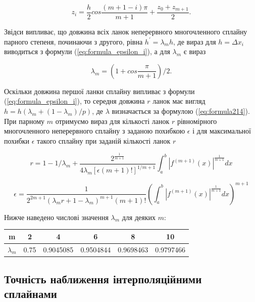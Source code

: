 \documentclass[ukrainian,14pt]{extarticle}
\begin{document}
$$z_i = \frac{h}{2} cos \frac{(m+1-i)\pi}{m+1} + \frac{z_0 + z_{m+1}}{2}.$$

Звідси випливає, що довжина всіх ланок неперервного многочленного сплайну парного степеня, починаючи з другого, рівна $h^' = \lambda_m h$, де вираз для $h = \Delta x_i$ виводиться з формули (\ref{eq:formula_epsilon_i}), а для $\lambda_m$ є вираз

\begin{equation}\label{eq:formula214}
\lambda_m = \left(1 + cos\frac{\pi}{m+1}\right) / 2.
\end{equation}


Оскільки довжина першої ланки сплайну випливає з формули (\ref{eq:formula_epsilon_i}), то середня довжина $r$ ланок має вигляд $h = h(\lambda_m + (1 - \lambda_m) / p)$, де $\lambda$ визначається за формулою (\ref{eq:formula214}). При парному $m$ отримуємо вираз для кількості ланок $r$ рівномірного многочленного неперервного сплайну з заданою похибкою $\epsilon$ і для максимальної похибки $\epsilon$ такого сплайну при заданій кількості ланок $r$

\begin{equation}\label{eq:formula215}
r = 1 - 1/ \lambda_m + \frac{2^{\frac{1}{m+1}}}{4 \lambda_m [\epsilon(m+1)!]^{1/m+1}} \int_a^b |f^{(m+1)}(x)|^{\frac{1}{m+1}} dx
\end{equation}

\begin{equation}\label{eq:formula216}
\epsilon = \frac{1}{2^{2m+1} (\lambda_m r + 1 - \lambda_m)^{m+1}(m+1)!} \left(\int_a^b|f^{(m+1)}(x)|^{\frac{1}{m+1}} dx \right)^{m+1}
\end{equation}

Нижче наведено числові значення $\lambda_m$ для деяких $m$:

\bgroup
\def\arraystretch{1.5}
\begin{center}
\begin{tabular}{ c | c |
c | c | c | c}
 m & 2 & 4 & 6 & 8 & 10 \\
 \hline
 $\lambda_m$ & 0.75 & 0.9045085 & 0.9504844 & 0.9698463 & 0.9797466 \\  

\end{tabular}
\end{center}
\egroup

\subsection{Точність наближення інтерполяційними сплайнами}
\end{document}
